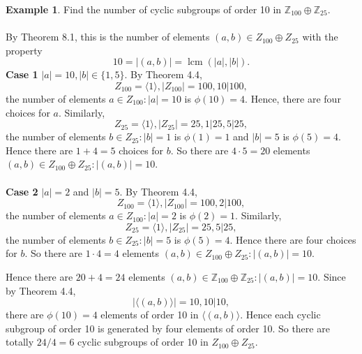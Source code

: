 \documentclass{article}
\DeclareMathOperator{\lcm}{lcm}
\theoremstyle{definition}
\newtheorem{example}{Example}[section]
\begin{document}
     \begin{example}
     Find the number of cyclic subgroups of order 10 in $\mathbb{Z}_{100} \oplus \mathbb{Z}_{25}$.
     \\ \\
     By Theorem 8.1, this is the number of elements $(a,b) \in Z_{100} \oplus Z_{25}$ with the property
     \begin{equation*}
         10 = |(a,b)| = \lcm(|a|,|b|).
     \end{equation*}
     \textbf{Case 1} $|a|=10,|b| \in \{1,5\}$. By Theorem 4.4, 
     \begin{equation*}
         Z_{100} = \langle 1 \rangle, |Z_{100}| = 100, 10 | 100,
     \end{equation*}
      the number of elements $a \in Z_{100}: |a| = 10$ is $\phi(10)=4$. Hence, there are four choices for $a$. Similarly,
      \begin{equation*}
          Z_{25} = \langle 1 \rangle, |Z_{25}| = 25, 1|25, 5|25,
      \end{equation*}
      the number of elements $b \in Z_{25}: |b|=1$ is $\phi(1)=1$ and $|b|=5$ is $\phi(5)=4$. Hence there are $1+4=5$ choices for $b$. So there are $4\cdot5=20$ elements $(a,b) \in Z_{100} \oplus Z_{25}: |(a,b)| = 10$.
     \\ \\
     \textbf{Case 2} $|a|=2$ and $|b|=5$. By Theorem 4.4,
     \begin{equation*}
          Z_{100} = \langle 1 \rangle, |Z_{100}| = 100, 2|100,
     \end{equation*}
     the number of elements $a \in Z_{100}: |a| = 2$ is $\phi(2)=1$. Similarly, 
     \begin{equation*}
          Z_{25} = \langle 1 \rangle, |Z_{25}| = 25, 5|25,
      \end{equation*}
      the number of elements $b \in Z_{25}: |b|=5$ is $\phi(5)=4$. Hence there are four choices for $b$. So there are $1\cdot4=4$ elements $(a,b) \in Z_{100} \oplus Z_{25}: |(a,b)| = 10$.
     
     Hence there are $20+4=24$ elements $(a,b) \in \mathbb{Z}_{100} \oplus \mathbb{Z}_{25}:|(a,b)|=10$. Since by Theorem 4.4, 
     \begin{equation*}
         |\langle (a,b) \rangle| = 10, 10|10,
     \end{equation*}
     there are $\phi(10)=4$ elements of order 10 in $\langle (a,b) \rangle$. Hence each cyclic subgroup of order 10 is generated by four elements of order 10. So there are totally $24/4=6$ cyclic subgroups of order 10 in $Z_{100} \oplus  Z_{25}$.
     \end{example}
     
\end{document}
